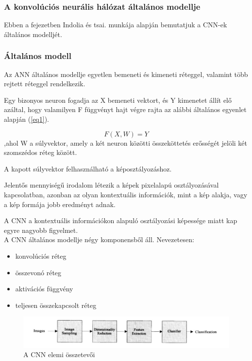 \documentclass[12pt,a4]{article}
\begin{document}
	\subsubsection{A konvolúciós neurális hálózat általános modellje}
    Ebben a fejezetben Indolia és tsai. \cite{CNN} munkája alapján bemutatjuk a CNN-ek általános modelljét.
 
	\subsubsection{Általános modell}
	Az ANN általános modellje egyetlen bemeneti és kimeneti réteggel,
	valamint több rejtett réteggel rendelkezik.
	
	Egy bizonyos 
	neuron fogadja az X bemeneti vektort, és Y kimenetet állít elő azáltal,
	hogy valamilyen F függvényt hajt végre rajta az alábbi általános egyenlet alapján (\ref{eq1}).
	\begin{mdframed}
	\begin{equation}
    \label{eq1}
			F(X, W) = Y
	\end{equation}
	,ahol W a súlyvektor, amely a két neuron közötti összeköttetés erősségét jelöli két szomszédos réteg között.
 	\end{mdframed}

	A kapott súlyvektor felhasználható a képosztályozáshoz.
	
	Jelentős mennyiségű irodalom létezik a képek pixelalapú osztályozásával
	kapcsolatban, azonban az olyan kontextuális információk, mint a kép alakja, vagy 
	a kép formája jobb eredményt adnak.
	
	A CNN a kontextuális információkon alapuló osztályozási képessége miatt kap egyre nagyobb figyelmet.\\
	
	
	A CNN általános modellje négy komponensből áll. Nevezetesen: 
	\begin{itemize}
		\item konvolúciós réteg
		\item összevonó réteg
		\item aktivációs függvény
		\item teljesen összekapcsolt réteg
	\end{itemize}

    \begin{figure}[h]	
		\centering
		\includegraphics[width=1\linewidth]{element}
		\caption{\cite{CNN} A CNN elemi összetevői}
        \label{fig:cnnelem}
	\end{figure}
 
\end{document}
